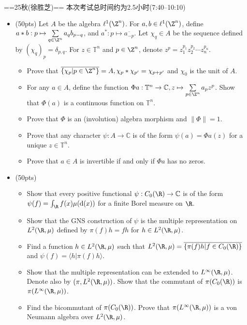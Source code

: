 
==25秋(徐胜芝)==
本次考试总时间约为2.5小时(7:40--10:10)
\begin{itemize}
    \item[一、](50pts) Let $A$ be the algebra $\ell^1(\Z^n)$. For $a,b\in \ell^1(\Z^n)$, define $a*b: p\mapsto \sum\limits_{q\in \Z^n}a_qb_{p-q}$, and $a^*: p\mapsto \overline{a_{-p}}$. Let $\chi_q\in A$ be the sequence defined by $(\chi_q)_p=\delta_{p,q}$. For $z\in\mathbb{T}^n$ and $p\in \Z^n$, denote $z^p=z_1^{p_1}z_2^{p_2}\cdots z_n^{p_n}$.
    \begin{itemize}
        \item[(1)]Prove that $\overline{\{\chi_p|p\in\Z^n\}}=A,\chi_p*\chi_{p'}=\chi_{p+p'}$ and $\chi_0$ is the unit of $A$.
        \item[(2)]For any $a\in A$, define the function $\Phi a: \mathbb{T}^n\to \mathbb{C}, z\mapsto \sum\limits_{p\in \Z^n} a_pz^p$. Show that $\Phi(a)$ is a continuous function on $\mathbb{T}^n$.
        \item[(3)]Prove that $\Phi$ is an (involution) algebra morphism and $\|\Phi\|=1$.
        \item[(4)]Prove that any character $\psi: A\to \mathbb{C}$ is of the form $\psi(a)=\Phi a(z)$ for a unique $z\in\mathbb{T}^n$.
        \item[(5)]Prove that $a\in A$ is invertible if and only if $\Phi a$ has no zeros.
    \end{itemize}
    \item[二、](50pts)
    \begin{itemize}
        \item[(0)]Show that every positive functional $\psi: C_0(\R)\to \mathbb{C}$ is of the form $\psi(f)=\int_\R f(x)\mu(\mathrm{d}(x))$ for a finite Borel measure on $\R$.
        \item[(1)]Show that the GNS construction of $\psi$ is the multiple representation on $L^2(\R,\mu)$ defined by $\pi(f)h=fh$ for $h\in L^2(\R,\mu)$.
        \item[(2)]Find a function $h\in L^2(\R,\mu)$ such that $L^2(\R,\mu)=\overline{\{\pi(f)h|f\in C_0(\R)\}}$ and $\psi(f)=\langle h|\pi(f)h\rangle$.
        \item[(3)]Show that the multiple representation can be extended to $L^\infty(\R,\mu)$. Denote also by $(\pi, L^2(\R,\mu))$. Show that the commutant of $\pi(C_0(\R))$ is $\pi(L^\infty(\R,\mu))$.
        \item[(4)]Find the bicommutant of $\pi(C_0(\R))$. Prove that $\pi(L^\infty(\R,\mu))$ is a von Neumann algebra over $L^2(\R,\mu)$.
    \end{itemize}
\end{itemize}